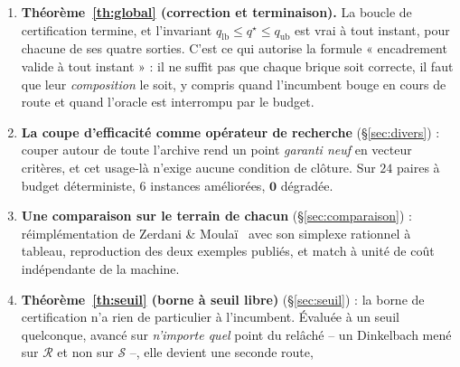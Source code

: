 \documentclass[11pt,a4paper]{article}
\theoremstyle{plain}
\theoremstyle{remark}
\newcommand{\Scal}{\mathcal{S}}
\newcommand{\Rcal}{\mathcal{R}}
\newcommand{\qs}{q^{\star}}
\begin{document}
\begin{enumerate}[leftmargin=*,itemsep=3pt]
      (\S\ref{sec:vivier}) : les deux coupes ayant la même forme et le même
      coût, elles partagent un plafond ; mais les classer sur une
      \emph{seule échelle} affame l'archive -- jusqu'à zéro coupe d'archive
      sur deux lignes sur six -- alors qu'elle est la seule source capable
      de \emph{vider} le relâché. On classe donc à l'intérieur de chaque
      source, puis on alterne, sans paramètre nouveau. Jointe à un ordre
      de vivier stable par préfixe -- les deux sont nécessaires et aucune
      ne suffit seule --, la monotonie en budget passe de $\mathbf{1/6}$ à
      $\mathbf{6/6}$, et une ligne de $46{,}2\ \%$ d'écart garanti à
      $\mathbf{0{,}0\ \%}$.
      \emph{Nous avions annoncé ici qu'une mise en \oe uvre à budgets
      séparés perdait $28$ preuves sur $90$. Ce chiffre est retiré}
      (\S\ref{sec:vivier}) : remesuré sous plafond déterministe il ne
      montre aucun effondrement -- $5/18$ preuves dans les deux bras.
\item \textbf{Théorème~\ref{th:global} (correction et terminaison).} La
      boucle de certification termine, et l'invariant
      $q_{\text{lb}}\le\qs\le q_{\text{ub}}$ est vrai à tout instant, pour
      chacune de ses quatre sorties. C'est ce qui autorise la formule
      « encadrement valide à tout instant » : il ne suffit pas que chaque
      brique soit correcte, il faut que leur \emph{composition} le soit,
      y compris quand l'incumbent bouge en cours de route et quand l'oracle
      est interrompu par le budget.
\item \textbf{La coupe d'efficacité comme opérateur de recherche}
      (\S\ref{sec:divers}) : couper autour de toute l'archive rend un point
      \emph{garanti neuf} en vecteur critères, et cet usage-là n'exige
      aucune condition de clôture. Sur $24$ paires à budget déterministe,
      $6$ instances améliorées, $\mathbf{0}$ dégradée.
\item \textbf{Une comparaison sur le terrain de chacun}
      (\S\ref{sec:comparaison}) : réimplémentation de Zerdani \&
      Moulaï~\cite{zerdani2011} avec
      son simplexe rationnel à tableau, reproduction des deux exemples
      publiés, et match à unité de coût indépendante de la machine.
\item \textbf{Théorème~\ref{th:seuil} (borne à seuil libre)}
      (\S\ref{sec:seuil}) : la borne de certification n'a rien de
      particulier à l'incumbent. Évaluée à un seuil quelconque, avancé sur
      \emph{n'importe quel} point du relâché -- un Dinkelbach mené sur
      $\Rcal$ et non sur $\Scal$ --, elle devient une seconde route,

\end{enumerate}
\end{document}
